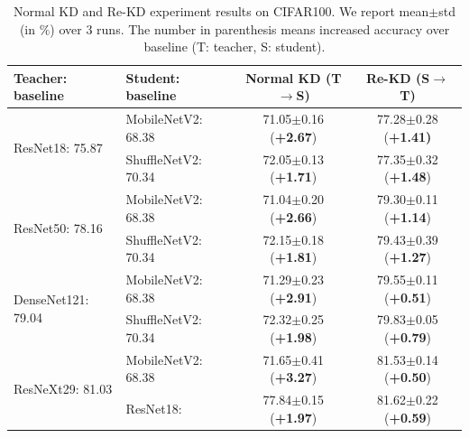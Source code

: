\documentclass[10pt,twocolumn,letterpaper]{article}
\begin{document}
\begin{table}[!h]
\centering
\renewcommand\arraystretch{1.0}
\small
\caption{Normal KD and Re-KD experiment results on CIFAR100.  We report mean$\pm$std (in $\%$) over 3 runs. The number in parenthesis means increased accuracy over baseline (T: teacher, S: student).} 
\label{tab: Re-KD_CIFAR100}
\begin{tabular}{l|l|c|c}
\toprule
Teacher: baseline &Student: baseline  &Normal KD (T$\rightarrow$S)   &Re-KD (S$\rightarrow$T)       \\ \midrule
\multirow{2}{*}{ResNet18: 75.87} & MobileNetV2: 68.38   & 71.05$\pm$0.16 (\textbf{+2.67}) & 77.28$\pm$0.28 (\textbf{+1.41)} \\ %
                          & ShuffleNetV2: 70.34  & 72.05$\pm$0.13 (\textbf{+1.71})  &77.35$\pm$0.32 (\textbf{+1.48})    \\ \midrule
                          
\multirow{2}{*}{ResNet50: 78.16} & MobileNetV2: 68.38  &71.04$\pm$0.20 (\textbf{+2.66}) &79.30$\pm$0.11 (\textbf{+1.14}) \\ %
                           & ShuffleNetV2: 70.34 &72.15$\pm$0.18  (\textbf{+1.81}) &79.43$\pm$0.39 (\textbf{+1.27}) \\ \midrule
                           
\multirow{2}{*}{DenseNet121: 79.04} & MobileNetV2: 68.38  &71.29$\pm$0.23 (\textbf{+2.91}) &79.55$\pm$0.11 (\textbf{+0.51})\\ %
                           & ShuffleNetV2: 70.34 &72.32$\pm$0.25 (\textbf{+1.98})& 79.83$\pm$0.05 (\textbf{+0.79})  \\ \midrule 
                           
\multirow{2}{*}{ResNeXt29: 81.03}  & MobileNetV2: 68.38 &71.65$\pm$0.41 (\textbf{+3.27}) &81.53$\pm$0.14 (\textbf{+0.50})  \\ %
                           & ResNet18:\qquad 75.87   & 77.84$\pm$0.15 (\textbf{+1.97})  & 81.62$\pm$0.22 (\textbf{+0.59})
                           \\ \bottomrule
\end{tabular}
\vspace{-5pt}
\end{table}
\end{document}
